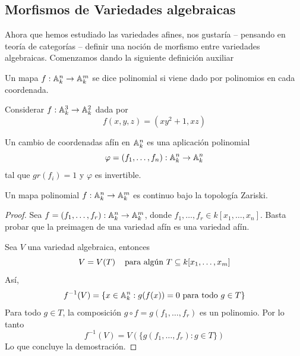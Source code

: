 \documentclass[11pt]{article}
\begin{document}
\newpage
\subsection{Morfismos de Variedades algebraicas}
\noindent Ahora que hemos estudiado las variedades afines, nos gustaría -- pensando en teoría de
categorías -- definir una noción de morfismo entre variedades algebraicas. Comenzamos dando la 
siguiente definición auxiliar

\begin{dfn}
    Un mapa $f:\mathbb{A}_{k}^{n}\to\mathbb{A}_{k}^{m}$ se dice polinomial si viene dado por polinomios en cada
    coordenada.
\end{dfn}

\begin{ejm}
    Considerar $f:\mathbb{A}_{k}^{3}\to\mathbb{A}_{k}^{2}$ dada por
    \begin{equation*}
        f(x,y,z)=(xy^{2}+1,xz)
    \end{equation*}
\end{ejm}

\begin{dfn}
    Un cambio de coordenadas afín en $\mathbb{A}_{k}^{n}$ es una aplicación polinomial 
    \begin{equation*}
        \varphi=(f_{1},\dots,f_{n}):\mathbb{A}_{k}^{n}\to\mathbb{A}_{k}^{n}
    \end{equation*}
    tal que $gr(f_{i})=1$ y $\varphi$ es invertible.
\end{dfn}

\begin{prop}
    Un mapa polinomial $f:\mathbb{A}_{k}^{n}\to\mathbb{A}_{k}^{m}$ es continuo bajo la topología Zariski.
\end{prop}

\begin{proof}
    Sea $f=(f_{1},\dots,f_{r}):\mathbb{A}_{k}^{n}\to\mathbb{A}_{k}^{m}$, donde 
    $f_{1},\dots,f_{r}\in k[x_{1},\dots,x_{n}]$. Basta probar que la preimagen de una variedad 
    afín es una variedad afín.

    Sea $V$ una variedad algebraica, entonces
    \begin{equation*}
        V=V(T) \hspace{4mm}\text{para algún } T\subseteq k[x_{1},\dots,x_{m}]
    \end{equation*}
    Así,
    \begin{equation*}
        f^{-1}(V)=\{x\in\mathbb{A}_{k}^{n}:g(f(x))=0\text{ para todo }g\in T\}
    \end{equation*}
    Para todo $g\in T$, la composición $g\circ f=g(f_{1},\dots,f_{r})$ es un polinomio. Por lo 
    tanto
    \begin{equation*}
        f^{-1}(V)=V(\{g(f_{1},\dots,f_{r}):g\in T\})
    \end{equation*}
    Lo que concluye la demostración.
\end{proof}
\end{document}

